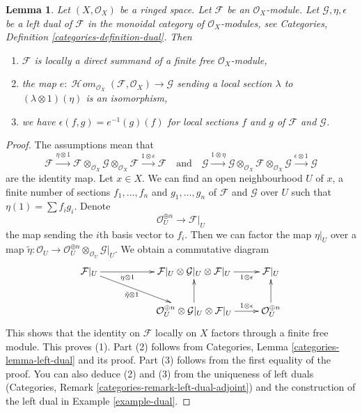\documentclass{stacks-project}
\theoremstyle{plain}
\newtheorem{lemma}[subsection]{Lemma}
\theoremstyle{definition}
\theoremstyle{remark}
\numberwithin{equation}{subsection}
\def\SheafHom{\mathop{\mathcal{H}\!\mathit{om}}\nolimits}
\begin{document}
\begin{lemma}
\label{lemma-left-dual-module}
Let $(X, \mathcal{O}_X)$ be a ringed space. Let $\mathcal{F}$ be an
$\mathcal{O}_X$-module. Let $\mathcal{G}, \eta, \epsilon$
be a left dual of $\mathcal{F}$ in the monoidal category of
$\mathcal{O}_X$-modules, see
Categories, Definition \ref{categories-definition-dual}. Then
\begin{enumerate}
\item $\mathcal{F}$ is locally a direct summand of a finite free
$\mathcal{O}_X$-module,
\item the map
$e : \SheafHom_{\mathcal{O}_X}(\mathcal{F}, \mathcal{O}_X) \to \mathcal{G}$
sending a local section $\lambda$ to $(\lambda \otimes 1)(\eta)$
is an isomorphism,
\item we have $\epsilon(f, g) = e^{-1}(g)(f)$ for local sections
$f$ and $g$ of $\mathcal{F}$ and $\mathcal{G}$.
\end{enumerate}
\end{lemma}

\begin{proof}
The assumptions mean that
$$
\mathcal{F} \xrightarrow{\eta \otimes 1}
\mathcal{F} \otimes_{\mathcal{O}_X} \mathcal{G}
\otimes_{\mathcal{O}_X} \mathcal{F}
\xrightarrow{1 \otimes \epsilon} \mathcal{F}
\quad\text{and}\quad
\mathcal{G} \xrightarrow{1 \otimes \eta}
\mathcal{G} \otimes_{\mathcal{O}_X} \mathcal{F}
\otimes_{\mathcal{O}_X} \mathcal{G}
\xrightarrow{\epsilon \otimes 1} \mathcal{G}
$$
are the identity map. Let $x \in X$. We can find an open neighbourhood
$U$ of $x$, a finite number of sections $f_1, \ldots, f_n$
and $g_1, \ldots, g_n$ of
$\mathcal{F}$ and $\mathcal{G}$ over $U$ such that
$\eta(1) = \sum f_i g_i$. Denote
$$
\mathcal{O}_U^{\oplus n} \to \mathcal{F}|_U
$$
the map sending the $i$th basis vector to $f_i$. Then we
can factor the map $\eta|_U$ over a map
$\tilde \eta : \mathcal{O}_U \to
\mathcal{O}_U^{\oplus n} \otimes_{\mathcal{O}_U} \mathcal{G}|_U$.
We obtain a commutative diagram
$$
\xymatrix{
\mathcal{F}|_U
\ar[rr]_-{\eta \otimes 1} \ar[rrd]_-{\tilde \eta \otimes 1} & &
\mathcal{F}|_U \otimes \mathcal{G}|_U \otimes \mathcal{F}|_U
\ar[r]_-{1 \otimes \epsilon} &
\mathcal{F}|_U \\
& &
\mathcal{O}_U^{\oplus n} \otimes \mathcal{G}|_U \otimes \mathcal{F}|_U
\ar[u] \ar[r]^-{1 \otimes \epsilon} &
\mathcal{O}_U^{\oplus n} \ar[u]
}
$$
This shows that the identity on $\mathcal{F}$ locally on $X$
factors through a finite free module. This proves (1). Part (2) follows from
Categories, Lemma \ref{categories-lemma-left-dual} and its proof.
Part (3) follows from the first equality of the proof.
You can also deduce (2) and (3) from the uniqueness of left duals
(Categories, Remark \ref{categories-remark-left-dual-adjoint})
and the construction of the left dual in
Example \ref{example-dual}.
\end{proof}
\end{document}
